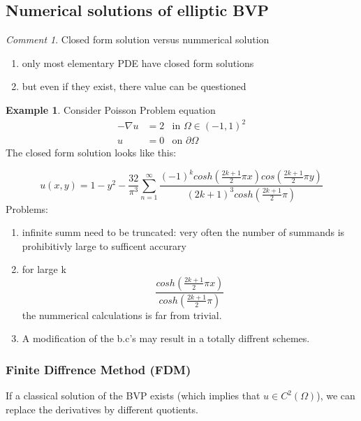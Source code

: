 \documentclass[ngerman]{article}
\theoremstyle{definition}
\newtheorem*{exa}{Example}
\theoremstyle{remark}
\newtheorem*{comm}{Comment}
\newcommand{\f}[2]{\frac{#1}{#2}}							%
\newcommand{\p}{\partial}
\newcommand{\OO}{\Omega}
\newcommand{\tri}{\nabla}
\newcommand{\tx}[1]{\text{#1}}
\begin{document}
\subsection{Numerical solutions of elliptic BVP}
\begin{comm}
  Closed form solution versus nummerical solution
  \begin{enumerate}
  \item only most elementary PDE have closed form solutions
  \item but even if they exist, there value can be questioned
  \end{enumerate}
\end{comm}
\begin{exa}
  Consider Poisson Problem equation\\
  \begin{align*}
    -\tri u &= 2 & \tx{in }\OO\in (-1,1)^2\\
    u&=0 & \tx{on }\p\OO
  \end{align*}
  The closed form solution looks like this:

  $$u(x,y) = 1 - y^2 -\f{32}{\pi^3} \sum_{n=1}^\infty \f{(-1)^k cosh(\f{2k+1}{2}\pi x) cos(\f{2k+1}{2}\pi y)}{(2k+1)^3cosh(\f{2k+1}{2}\pi)}$$
  Problems:
  \begin{enumerate}
  \item infinite summ need to be truncated: very often the number of summands is prohibitivly large to sufficent accurary
  \item for large k $$\f{cosh(\f{2k+1}{2}\pi x)}{cosh(\f{2k+1}{2}\pi)}$$
    the nummerical calculations is far from trivial.
  \item A modification of the b.c's may result in a totally diffrent schemes.
    
  \end{enumerate}
\end{exa}
\subsubsection{Finite Diffrence Method (FDM)}
If a classical solution of the BVP exists (which implies that $u\in C^2(\OO)$), we can replace the derivatives by different quotients.\\
\end{document}
